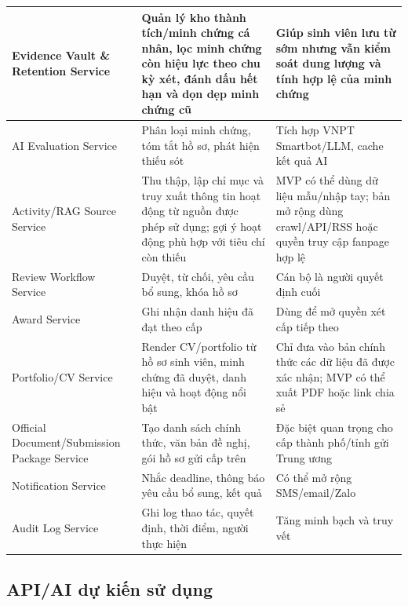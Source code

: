 \begin{longtable}{|>{\raggedright\arraybackslash}p{}|
                  >{\raggedright\arraybackslash}p{}|
                  >{\raggedright\arraybackslash}p{}|}
Evidence Vault \& Retention Service &
Quản lý kho thành tích/minh chứng cá nhân, lọc minh chứng còn hiệu lực theo chu kỳ xét, đánh dấu hết hạn và dọn dẹp minh chứng cũ &
Giúp sinh viên lưu từ sớm nhưng vẫn kiểm soát dung lượng và tính hợp lệ của minh chứng \\ \hline

AI Evaluation Service &
Phân loại minh chứng, tóm tắt hồ sơ, phát hiện thiếu sót &
Tích hợp VNPT Smartbot/LLM, cache kết quả AI \\ \hline

Activity/RAG Source Service &
Thu thập, lập chỉ mục và truy xuất thông tin hoạt động từ nguồn được phép sử dụng; gợi ý hoạt động phù hợp với tiêu chí còn thiếu &
MVP có thể dùng dữ liệu mẫu/nhập tay; bản mở rộng dùng crawl/API/RSS hoặc quyền truy cập fanpage hợp lệ \\ \hline

Review Workflow Service &
Duyệt, từ chối, yêu cầu bổ sung, khóa hồ sơ &
Cán bộ là người quyết định cuối \\ \hline

Award Service &
Ghi nhận danh hiệu đã đạt theo cấp &
Dùng để mở quyền xét cấp tiếp theo \\ \hline

Portfolio/CV Service &
Render CV/portfolio từ hồ sơ sinh viên, minh chứng đã duyệt, danh hiệu và hoạt động nổi bật &
Chỉ đưa vào bản chính thức các dữ liệu đã được xác nhận; MVP có thể xuất PDF hoặc link chia sẻ \\ \hline

Official Document/Submission Package Service &
Tạo danh sách chính thức, văn bản đề nghị, gói hồ sơ gửi cấp trên &
Đặc biệt quan trọng cho cấp thành phố/tỉnh gửi Trung ương \\ \hline

Notification Service &
Nhắc deadline, thông báo yêu cầu bổ sung, kết quả &
Có thể mở rộng SMS/email/Zalo \\ \hline

Audit Log Service &
Ghi log thao tác, quyết định, thời điểm, người thực hiện &
Tăng minh bạch và truy vết \\ \hline

\end{longtable}
\endgroup

\subsection{API/AI dự kiến sử dụng}

